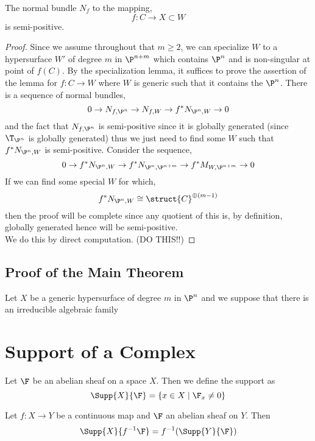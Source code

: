 \documentclass[12pt]{article}
\begin{document}
\begin{lemma}
The normal bundle $N_{f}$ to the mapping,
\[ f : C \to X \subset W \]
is semi-positive.
\end{lemma}

\begin{proof}
Since we assume throughout that $m \ge 2$, we can specialize $W$ to a hypersurface $W'$ of degree $m$ in $\P^{n+m}$ which contains $\P^n$ and is non-singular at point of $f(C)$. By the specialization lemma, it suffices to prove the assertion of the lemma for $f : C \to W$ where $W$ is generic such that it contains the $\P^n$. There is a sequence of normal bundles,
\[ 0 \to N_{f, \P^n} \to N_{f, W} \to f^* N_{\P^n, W} \to 0 \]
and the fact that $N_{f, \P^n}$ is semi-positive since it is globally generated (since $\T_{\P^n}$ is globally generated) thus we just need to find some $W$ such that $f^* N_{\P^n, W}$ is semi-positive. Consider the sequence,
\[ 0 \to f^* N_{\P^n, W} \to f^* N_{\P^n, \P^{n+m}} \to f^* M_{W, \P^{n+m}} \to 0 \]
If we can find some special $W$ for which,
\[ f^* N_{\P^n, W} \cong \struct{C}^{\oplus (m-1)} \]
then the proof will be complete since any quotient of this is, by definition, globally generated hence will be semi-positive.
\bigskip\\
We do this by direct computation. (DO THIS!!)
\end{proof}

\subsection{Proof of the Main Theorem}

Let $X$ be a generic hypersurface of degree $m$ in $\P^n$ and we suppose that there is an irreducible algebraic family

\section{Support of a Complex}

\begin{defn}
Let $\F$ be an abelian sheaf on a space $X$. Then we define the support as
\[ \Supp{X}{\F} = \{ x \in X \mid \F_x \neq 0 \} \]
\end{defn}

\begin{prop}
Let $f : X \to Y$ be a continuous map and $\F$ an abelian sheaf on $Y$. Then
\[ \Supp{X}{f^{-1} \F} = f^{-1}(\Supp{Y}{\F}) \]
\end{prop}
\end{document}
